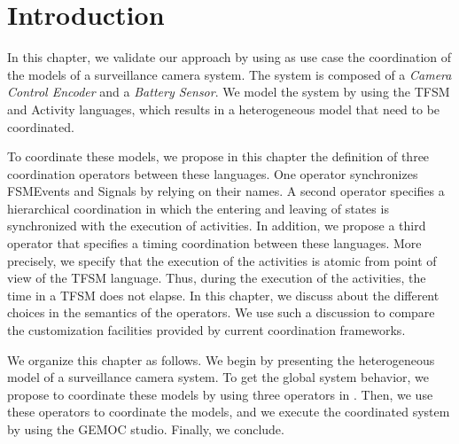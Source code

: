 \section{Introduction}
In this chapter, we validate our approach by using as use case the coordination of the models of a surveillance camera system. The system is composed of a \emph{Camera Control Encoder} and a \emph{Battery Sensor}. We model the system by using the TFSM and Activity languages, which results in a heterogeneous model that need to be coordinated. 


To coordinate these models, we propose in this chapter the definition of three \bcool coordination operators between these languages. One operator synchronizes FSMEvents and Signals by relying on their names. A second operator specifies a hierarchical coordination in which the entering and leaving of states is synchronized with the execution of activities. In addition, we propose a third operator that specifies a timing coordination between these languages. More precisely, we specify that the execution of the activities is atomic from point of view of the TFSM language. Thus, during the execution of the activities, the time in a TFSM does not elapse. In this chapter, we discuss about the different choices in the semantics of the operators. We use such a discussion to compare the customization facilities provided by current coordination frameworks.  

We organize this chapter as follows. We begin by presenting the heterogeneous model of a surveillance camera system. To get the global system behavior, we propose to coordinate these models by using three operators in \bcool. Then, we use these operators to coordinate the models, and we execute the coordinated system by using the GEMOC studio. Finally, we conclude.